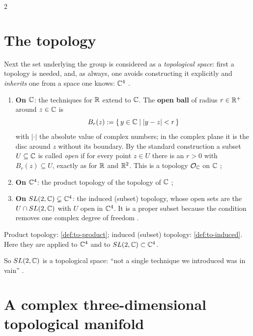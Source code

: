 \begin{paracol}{2}
\section{The topology}\label{sec:sl-top}

Next the set underlying the group is considered as a \emph{topological space}: first a topology is needed, and, as always, one avoids constructing it explicitly and \emph{inherits} one from a space one knows: $\mathbb{C}^4$  .
\begin{enumerate}
  \item[1.] \textbf{On $\mathbb{C}$}: the techniques for $\mathbb{R}$ extend to $\mathbb{C}$. The \textbf{open ball} of radius $r\in\mathbb{R}^+$ around $z\in\mathbb{C}$ is
  \[
    B_r(z):=\{\,y\in\mathbb{C}\mid |y-z|<r\,\}
  \]
  with $|\cdot|$ the absolute value of complex numbers; in the complex plane it is the disc around $z$ without its boundary. By the standard construction a subset $U\subseteq\mathbb{C}$ is called \emph{open} if for every point $z\in U$ there is an $r>0$ with $B_r(z)\subseteq U$, exactly as for $\mathbb{R}$ and $\mathbb{R}^2$. This is a topology $\mathcal O_{\mathbb{C}}$ on $\mathbb{C}$      ;
  \item[2.] \textbf{On $\mathbb{C}^4$}: the product topology of the topology of $\mathbb{C}$ ;
  \item[3.] \textbf{On $SL(2,\mathbb{C})\subsetneq\mathbb{C}^4$}: the induced (subset) topology, whose open sets are the $U\cap SL(2,\mathbb{C})$ with $U$ open in $\mathbb{C}^4$. It is a proper subset because the condition removes one complex degree of freedom   .
\end{enumerate}
\begin{recall}
Product topology: \cref{def:to-product}; induced (subset) topology: \cref{def:to-induced}. Here they are applied to $\mathbb{C}^4$ and to $SL(2,\mathbb{C})\subset\mathbb{C}^4$.
\end{recall}
So $SL(2,\mathbb{C})$ is a topological space: ``not a single technique we introduced was in vain'' .

\section{A complex three-dimensional topological manifold}\label{sec:sl-manifold}


\end{paracol}
